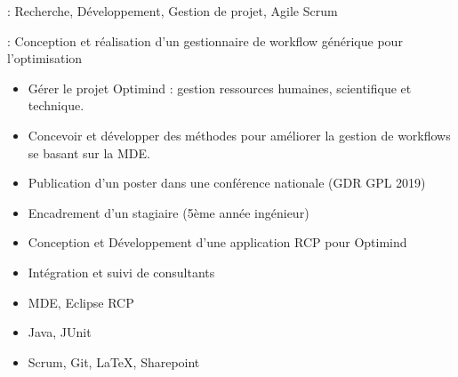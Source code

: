 

 : Recherche, Développement, Gestion de projet, Agile Scrum 

 : Conception et réalisation d'un gestionnaire de workflow générique pour l'optimisation

\bigskip


\begin{itemize}
\item Gérer le projet Optimind : gestion ressources humaines, scientifique et technique.
\item Concevoir et développer des méthodes pour améliorer la gestion de workflows se basant sur la MDE.
\end{itemize} 


\begin{itemize}
\item Publication d'un poster dans une conférence nationale (GDR GPL 2019)
\item Encadrement d'un stagiaire (5ème année ingénieur)
\item Conception et Développement d'une application RCP pour Optimind
\item Intégration et suivi de consultants 
\end{itemize} 


\begin{itemize}
\item MDE, Eclipse RCP
\item Java, JUnit
\item Scrum, Git, LaTeX, Sharepoint
\end{itemize}